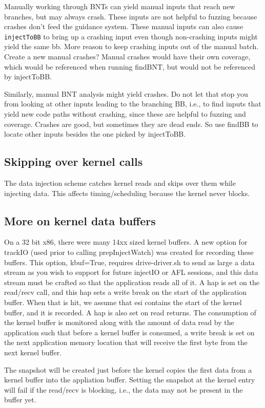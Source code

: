 \documentclass[titlepage]{article}
\begin{document}
\begin{appendices}
Manually working through BNTs can yield manual inputs that reach new branches, but may always crash.  These inputs are not helpful to fuzzing because crashes don't 
feed the guidance system.  These manual inputs can also cause {\tt injectToBB} to bring up a crashing input even though non-crashing inputs might yield the same bb.
More reason to keep crashing inputs out of the manual batch.  Create a new manual crashes?  Manual crashes would have their own coverage, which would be referenced
when running findBNT, but would not be referenced by injectToBB.

Similarly, manual BNT analysis might yield crashes.  Do not let that stop you from looking at other inputs leading to the branching BB, i.e., to find inputs that
yield new code paths without crashing, since these are helpful to fuzzing and coverage.  Crashes are good, but sometimes they are dead ends.  So use findBB to locate other
inputs besides the one picked by injectToBB.


\subsection{Skipping over kernel calls}
The data injection scheme catches kernel reads and skips over them while injecting data.  This affects timing/scheduling because the kernel never
blocks.

\subsection{More on kernel data buffers}
On a 32 bit x86, there were many 14xx sized kernel buffers.  A new option for trackIO (used prior to calling prepInjectWatch) was created for recording these buffers.
This option, kbuf=True, requires drive-driver.sh to send as large a data stream as you wish to support for future injectIO or AFL sessions, and this data stream
must be crafted so that the application reads all of it.  A hap is set on the read/recv call, and this hap sets a write break on the start of the application buffer.  When that is hit, we assume that esi contains the start of the kernel buffer, and it is recorded.  A hap is also set on read returns.  The consumption of the
kernel buffer is monitored along with the amount of data read by the application such that before a kernel buffer is consumed, a write break is set on the next 
application memory location that will receive the first byte from the next kernel buffer.

The snapshot will be created just before the kernel copies the first data from a kernel buffer into the appliation buffer.  Setting the snapshot at the kernel entry will fail if the read/recv
is blocking, i.e., the data may not be present in the buffer yet.


\end{appendices}
\end{document}
